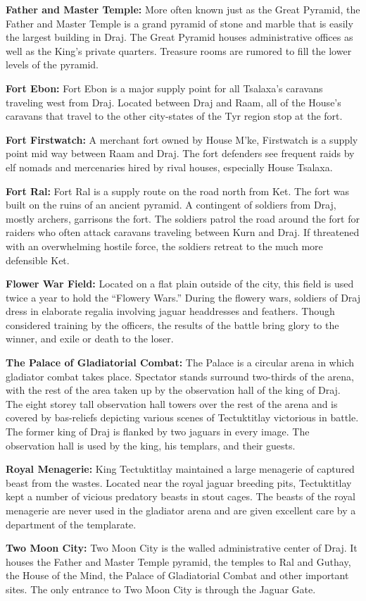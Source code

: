 {

	\textbf{Father and Master Temple:} More often known just as the Great Pyramid, the Father and Master Temple is a grand pyramid of stone and marble that is easily the largest building in Draj. The Great Pyramid houses administrative offices as well as the King's private quarters. Treasure rooms are rumored to fill the lower levels of the pyramid.

	\textbf{Fort Ebon:} Fort Ebon is a major supply point for all Tsalaxa's caravans traveling west from Draj. Located between Draj and Raam, all of the House's caravans that travel to the other city-states of the Tyr region stop at the fort.

	\textbf{Fort Firstwatch:} A merchant fort owned by House M'ke, Firstwatch is a supply point mid way between Raam and Draj. The fort defenders see frequent raids by elf nomads and mercenaries hired by rival houses, especially House Tsalaxa.

	\textbf{Fort Ral:} Fort Ral is a supply route on the road north from Ket. The fort was built on the ruins of an ancient pyramid. A contingent of soldiers from Draj, mostly archers, garrisons the fort. The soldiers patrol the road around the fort for raiders who often attack caravans traveling between Kurn and Draj. If threatened with an overwhelming hostile force, the soldiers retreat to the much more defensible Ket.

	\textbf{Flower War Field:} Located on a flat plain outside of the city, this field is used twice a year to hold the ``Flowery Wars.'' During the flowery wars, soldiers of Draj dress in elaborate regalia involving jaguar headdresses and feathers. Though considered training by the officers, the results of the battle bring glory to the winner, and exile or death to the loser.

	\textbf{The Palace of Gladiatorial Combat:} The Palace is a circular arena in which gladiator combat takes place. Spectator stands surround two-thirds of the arena, with the rest of the area taken up by the observation hall of the king of Draj. The eight storey tall observation hall towers over the rest of the arena and is covered by bas-reliefs depicting various scenes of Tectuktitlay victorious in battle. The former king of Draj is flanked by two jaguars in every image. The observation hall is used by the king, his templars, and their guests.

	\textbf{Royal Menagerie:} King Tectuktitlay maintained a large menagerie of captured beast from the wastes. Located near the royal jaguar breeding pits, Tectuktitlay kept a number of vicious predatory beasts in stout cages. The beasts of the royal menagerie are never used in the gladiator arena and are given excellent care by a department of the templarate.

	\textbf{Two Moon City:} Two Moon City is the walled administrative center of Draj. It houses the Father and Master Temple pyramid, the temples to Ral and Guthay, the House of the Mind, the Palace of Gladiatorial Combat and other important sites. The only entrance to Two Moon City is through the Jaguar Gate.
}
